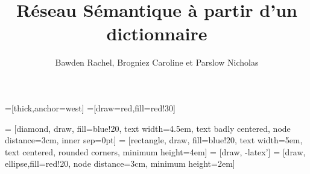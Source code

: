 \documentclass[a4paper, 12pt]{article}
\title{Réseau Sémantique à partir d'un dictionnaire}
\author{Bawden Rachel, Brogniez Caroline et Parslow Nicholas}
\date{}
\begin{document}
=[thick,anchor=west]
=[draw=red,fill=red!30]

 = [diamond, draw, fill=blue!20, 
    text width=4.5em, text badly centered, node distance=3cm, inner sep=0pt]
 = [rectangle, draw, fill=blue!20, 
    text width=5em, text centered, rounded corners, minimum height=4em]
 = [draw, -latex']
 = [draw, ellipse,fill=red!20, node distance=3cm,
    minimum height=2em]

\maketitle






























\end{document}
